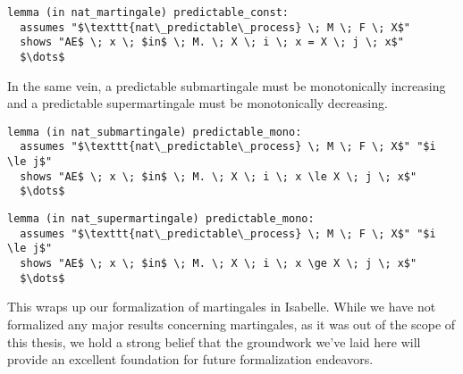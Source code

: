 \begin{isalemma}
{\small
\begin{lstlisting}[style=isabelle]
lemma (in nat_martingale) predictable_const:
  assumes "$\texttt{nat\_predictable\_process} \; M \; F \; X$"
  shows "AE$ \; x \; $in$ \; M. \; X \; i \; x = X \; j \; x$"
  $\dots$
\end{lstlisting}
}
\end{isalemma}

In the same vein, a predictable submartingale must be monotonically increasing and a predictable supermartingale must be monotonically decreasing.

\begin{isalemma}
{\small
\begin{lstlisting}[style=isabelle]
lemma (in nat_submartingale) predictable_mono:
  assumes "$\texttt{nat\_predictable\_process} \; M \; F \; X$" "$i \le j$"
  shows "AE$ \; x \; $in$ \; M. \; X \; i \; x \le X \; j \; x$"
  $\dots$
\end{lstlisting}
}
\end{isalemma}

\begin{isalemma}
{\small
\begin{lstlisting}[style=isabelle]
lemma (in nat_supermartingale) predictable_mono:
  assumes "$\texttt{nat\_predictable\_process} \; M \; F \; X$" "$i \le j$"
  shows "AE$ \; x \; $in$ \; M. \; X \; i \; x \ge X \; j \; x$"
  $\dots$
\end{lstlisting}
}
\end{isalemma}

This wraps up our formalization of martingales in Isabelle. While we have not formalized any major results concerning martingales, as it was out of the scope of this thesis, we hold a strong belief that the groundwork we've laid here will provide an excellent foundation for future formalization endeavors.